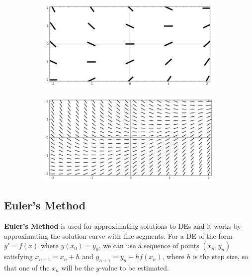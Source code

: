         \begin{figure} [hbt!]
            \centering
            \begin{subfigure}[b]{.45\textwidth}
                \includegraphics[scale=0.5]{Resources/Unit6DEs/Dirfield1}
            \end{subfigure}
            \begin{subfigure}[b]{.45\textwidth}
                \includegraphics[scale=0.5]{Resources/Unit6DEs/Dirfield2}
            \end{subfigure}
        \end{figure}


    \pagebreak
    \subsection{Euler's Method}
        \color{purple} \textbf{Euler's Method} \color{black} is used for approximating solutions
        to DEs and it works by approximating the solution curve with line segments. For a DE
        of the form $y'=f(x)$ where $y(x_0)=y_0$, we can use a sequence of points $(x_n,y_n)$
        satisfying $x_{n+1}=x_n+h$ and $y_{n+1}=y_n+hf(x_n)$, where $h$ is the step size, so that
        one of the $x_n$ will be the $y$-value to be estimated. \\


